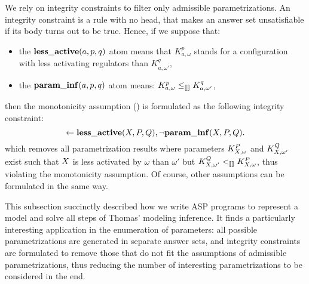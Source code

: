 We rely on integrity constraints to filter only admissible parametrizations.
An integrity constraint is a rule with no head, that makes an answer set unsatisfiable if its body turns out to be true.
Hence, if we suppose that:
\begin{itemize}
  \item the $\mathbf{less\_active}(a, p, q)$ atom means that $K^p_{a,\omega}$ stands for a configuration with less activating regulators than $K^q_{a,\omega'}$, %
  \item the $\mathbf{param\_inf}(a, p, q)$ atom means: $K^p_{a,\omega} \leq_{\llbracket\rrbracket} K^q_{a,\omega'}$,
\end{itemize}
then the monotonicity assumption () is formulated as the following integrity constraint:
$$\leftarrow \mathbf{less\_active}(X, P, Q), \neg \mathbf{param\_inf}(X, P, Q).$$
which removes all parametrization results where parameters $K^P_{X,\omega}$ and $K^Q_{X,\omega'}$ exist such that $X$ is less activated by $\omega$ than $\omega'$ %
but $K^Q_{X,\omega'} <_{\llbracket\rrbracket} K^P_{X,\omega}$,
thus violating the monotonicity assumption.
Of course, other assumptions can be formulated in the same way.

This subsection succinctly described how we write ASP programs to represent a model and solve all steps of Thomas' modeling inference.
It finds a particularly interesting application in the enumeration of parameters: all possible parametrizations are generated in separate answer sets, and integrity constraints are formulated to remove those that do not fit the assumptions of admissible parametrizations,
thus reducing the number of interesting parametrizations to be considered in the end.

